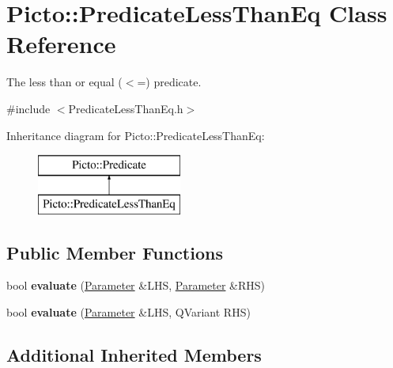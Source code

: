 \hypertarget{class_picto_1_1_predicate_less_than_eq}{\section{Picto\-:\-:Predicate\-Less\-Than\-Eq Class Reference}
\label{class_picto_1_1_predicate_less_than_eq}
}


The less than or equal ($<$=) predicate.  




{\ttfamily \#include $<$Predicate\-Less\-Than\-Eq.\-h$>$}

Inheritance diagram for Picto\-:\-:Predicate\-Less\-Than\-Eq\-:\begin{figure}[H]
\begin{center}
\leavevmode
\includegraphics[height=2.000000cm]{class_picto_1_1_predicate_less_than_eq}
\end{center}
\end{figure}
\subsection*{Public Member Functions}
\begin{DoxyCompactItemize}
\item 
\hypertarget{class_picto_1_1_predicate_less_than_eq_a1c13e162e4918499734a1c0f7922ba6e}{bool {\bfseries evaluate} (\hyperlink{class_picto_1_1_parameter}{Parameter} \&L\-H\-S, \hyperlink{class_picto_1_1_parameter}{Parameter} \&R\-H\-S)}\label{class_picto_1_1_predicate_less_than_eq_a1c13e162e4918499734a1c0f7922ba6e}

\item 
\hypertarget{class_picto_1_1_predicate_less_than_eq_a7189be8490a8e9e5420b6b79a36f15ec}{bool {\bfseries evaluate} (\hyperlink{class_picto_1_1_parameter}{Parameter} \&L\-H\-S, Q\-Variant R\-H\-S)}\label{class_picto_1_1_predicate_less_than_eq_a7189be8490a8e9e5420b6b79a36f15ec}

\end{DoxyCompactItemize}
\subsection*{Additional Inherited Members}


